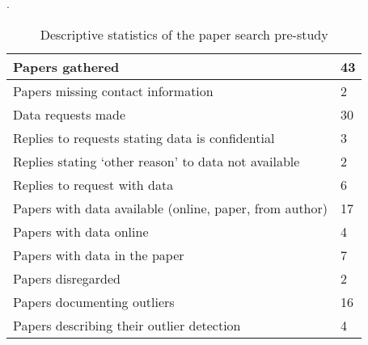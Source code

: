 \begin{table}.
  \caption{Descriptive statistics of the paper search pre-study}
  \label{tab:resultsprestudy-descstat}
  \centering
  {\small
  \begin{tabular}{ll}
    \hline
    Papers gathered & 43 \\
    \hline
    Papers missing contact information & 2 \\
    \hline
    Data requests made & 30 \\
    \hline
    Replies to requests stating data is confidential & 3 \\
    \hline
    Replies stating `other reason' to data not available & 2  \\
    \hline
    Replies to request with data & 6 \\
    \hline
    Papers with data available (online, paper, from author) & 17 \\
    \hline
    Papers with data online & 4 \\
    \hline
    Papers with data in the paper & 7 \\
    \hline
    Papers disregarded & 2 \\
    \hline
    Papers documenting outliers & 16 \\
    \hline
    Papers describing their outlier detection & 4 \\
    \hline
  \end{tabular}
  }
\end{table}
